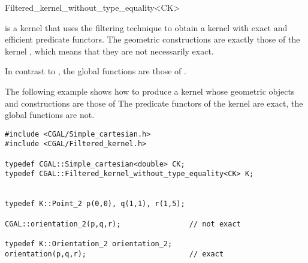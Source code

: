 
\begin{ccRefClass}{Filtered_kernel_without_type_equality<CK>}

\KernelRefLayout\gdef\ccTagOperatorLayout{\ccFalse}

\ccDefinition

\ccClassTemplateName is a kernel that uses the filtering technique
\cite{cgal:bbp-iayed-01} to obtain a kernel with exact and efficient
predicate functors.
The geometric constructions are exactly those
of the kernel , which means that they are not necessarily exact.

In contrast to , 
the global functions are those of .



\ccExample

The following example shows how to produce a kernel whose geometric
objects and constructions are those of 
The predicate functors of the kernel are exact, the global functions
are not.

\begin{verbatim}
#include <CGAL/Simple_cartesian.h>
#include <CGAL/Filtered_kernel.h>

typedef CGAL::Simple_cartesian<double> CK;
typedef CGAL::Filtered_kernel_without_type_equality<CK> K;


typedef K::Point_2 p(0,0), q(1,1), r(1,5);

CGAL::orientation_2(p,q,r);                // not exact

typedef K::Orientation_2 orientation_2;
orientation(p,q,r);                        // exact

\end{verbatim}



\end{ccRefClass}
